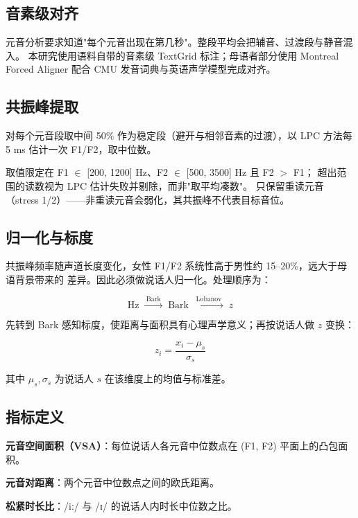 \documentclass[11pt,a4paper]{ctexart}
\newcommand{\ipa}[1]{/#1/}
\begin{document}
\subsection{音素级对齐}

元音分析要求知道"每个元音出现在第几秒"。整段平均会把辅音、过渡段与静音混入。
本研究使用语料自带的音素级 TextGrid 标注；母语者部分使用 Montreal Forced Aligner
配合 CMU 发音词典与英语声学模型完成对齐。

\subsection{共振峰提取}

对每个元音段取中间 50\% 作为稳定段（避开与相邻音素的过渡），以 LPC 方法每 5 ms 估计一次
F1/F2，取中位数。

取值限定在 F1 $\in$ [200, 1200] Hz、F2 $\in$ [500, 3500] Hz 且 F2 $>$ F1；
超出范围的读数视为 LPC 估计失败并剔除，而非"取平均凑数"。
只保留重读元音（stress 1/2）——非重读元音会弱化，其共振峰不代表目标音位。

\subsection{归一化与标度}

共振峰频率随声道长度变化，女性 F1/F2 系统性高于男性约 15--20\%，远大于母语背景带来的
差异。因此必须做说话人归一化。处理顺序为：

\begin{equation}
\text{Hz} \;\xrightarrow{\;\text{Bark}\;}\; \text{Bark}
\;\xrightarrow{\;\text{Lobanov}\;}\; z
\end{equation}

先转到 Bark 感知标度，使距离与面积具有心理声学意义；再按说话人做 $z$ 变换：

\begin{equation}
z_i = \frac{x_i - \mu_s}{\sigma_s}
\end{equation}

其中 $\mu_s,\sigma_s$ 为说话人 $s$ 在该维度上的均值与标准差。

\subsection{指标定义}

\textbf{元音空间面积（VSA）}：每位说话人各元音中位数点在 (F1, F2) 平面上的凸包面积。

\textbf{元音对距离}：两个元音中位数点之间的欧氏距离。

\textbf{松紧时长比}：\ipa{iː} 与 \ipa{ɪ} 的说话人内时长中位数之比。
\end{document}
